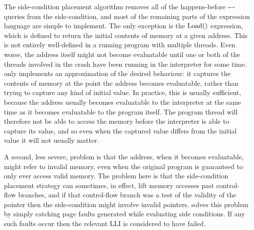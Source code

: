 The side-condition placement algorithm removes
all of the happens-before $\leftarrowtail$ queries from the
side-condition, and most of the remaining parts of the {\StateMachine}
expression language are simple to implement.  The only exception is
the $\mathrm{Load}()$ expression, which is defined to return the initial
contents of memory at a given address.  This is not entirely
well-defined in a running program with multiple threads.  Even worse,
the address itself might not become evaluatable until one or both of
the threads involved in the crash have been running in the interpreter
for some time.  {\Implementation} only implements an approximation of
the desired behaviour: it captures the contents of memory at the point
the address becomes evaluatable, rather than trying to capture any
kind of initial value.  In practice, this is usually sufficient,
because the address usually becomes evaluatable to the interpreter at
the same time as it becomes evaluatable to the program itself.  The
program thread will therefore not be able to access the memory before
the interpreter is able to capture its value, and so even when the
captured value differs from the initial value it will not usually
matter.

A second, less severe, problem is that the address, when it becomes
evaluatable, might refer to invalid memory, even when the original
program is guaranteed to only ever access valid memory.  The problem
here is that the side-condition placement strategy can sometimes, in
effect, lift memory accesses past control-flow branches, and if that
control-flow branch was a test of the validity of the pointer then the
side-condition might involve invalid pointers.  {\Implementation}
solves this problem by simply catching page faults generated while
evaluating side conditions.  If any such faults occur then the
relevant LLI is considered to have failed.

